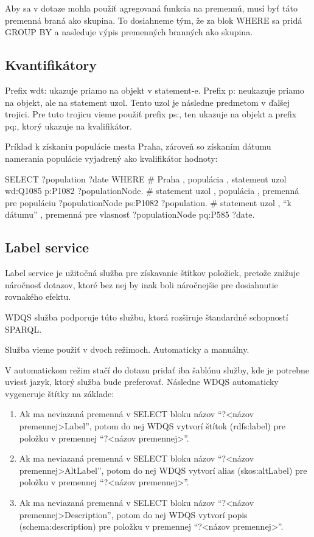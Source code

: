 Aby sa v dotaze mohla použiť agregovaná funkcia na premennú, musí byť táto premenná braná ako skupina.
To dosiahneme tým, že za blok WHERE {} sa pridá GROUP BY a nasleduje výpis premenných branných ako skupina.

\subsection*{Kvantifikátory}

Prefix wdt: ukazuje priamo na objekt v statement-e. Prefix p: neukazuje priamo na objekt, ale
na statement uzol. Tento uzol je následne predmetom v ďalšej trojici. Pre tuto trojicu vieme
použiť prefix ps:, ten ukazuje na objekt a prefix pq:, ktorý ukazuje na kvalifikátor.

Príklad k získaniu populácie mesta Praha, zároveň so získaním dátumu namerania populácie vyjadrený ako kvalifikátor hodnoty: 
\begin{code}
    SELECT ?population ?date
    WHERE
        {
            # Praha , populácia , statement uzol
            wd:Q1085 p:P1082 ?populationNode.
            # statement uzol , populácia , premenná pre populáciu
            ?populationNode ps:P1082 ?population.
            # statement uzol , “k dátumu” , premenná pre vlasnosť
            ?populationNode pq:P585 ?date.
        }
\end{code}

\subsection{Label service}
Label service je užitočná služba pre získavanie štítkov položiek, pretože 
znižuje náročnosť dotazov, ktoré bez nej by inak boli náročnejšie pre dosiahnutie rovnakého efektu. 

WDQS služba podporuje túto službu, ktorá rozširuje štandardné schopností SPARQL. 

Služba vieme použiť v dvoch režimoch. Automaticky a manuálny. 

V automatickom režim stačí do dotazu pridať iba šablónu služby, kde je potrebne uviesť 
jazyk, ktorý služba bude preferovať. Následne WDQS automaticky vygeneruje štítky na základe: 
\begin{enumerate}
    \item Ak ma neviazaná premenná v SELECT bloku názov “?<názov premennej>Label”, potom do nej WDQS vytvorí štítok 
          (rdfs:label) pre položku v premennej “?<názov premennej>”. 
    \item Ak ma neviazaná premenná v SELECT bloku názov “?<názov premennej>AltLabel”, potom do nej WDQS vytvorí alias 
          (skos:altLabel) pre položku v premennej “?<názov premennej>”. 
    \item Ak ma neviazaná premenná v SELECT bloku názov “?<názov premennej>Description”, potom do nej WDQS vytvorí popis 
          (schema:description) pre položku v premennej “?<názov premennej>”. 
\end{enumerate}

